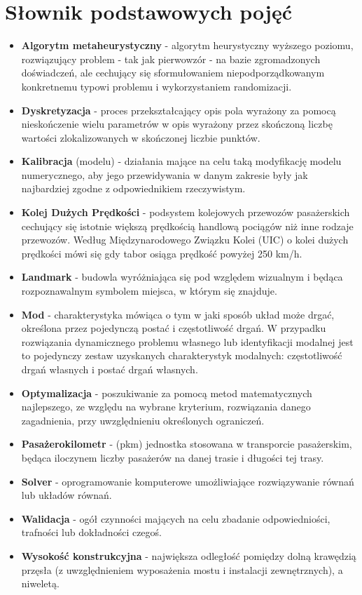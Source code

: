 \section*{Słownik podstawowych pojęć}
\begin{itemize}[label = {},leftmargin=0pt]
\item \textbf{Algorytm metaheurystyczny} - algorytm heurystyczny wyższego poziomu, rozwiązujący problem - tak jak pierwowzór - na bazie zgromadzonych doświadczeń, ale cechujący się sformułowaniem niepodporządkowanym konkretnemu typowi problemu i wykorzystaniem randomizacji. 
\item \textbf{Dyskretyzacja} - proces przekształcający opis pola wyrażony za pomocą nieskończenie wielu parametrów w opis wyrażony przez skończoną liczbę wartości zlokalizowanych w skończonej liczbie punktów.
\item \textbf{Kalibracja} (modelu) - działania mające na celu taką modyfikację modelu numerycznego, aby jego przewidywania w danym zakresie były jak najbardziej zgodne z odpowiednikiem rzeczywistym.
\item \textbf{Kolej Dużych Prędkości} - podsystem kolejowych przewozów pasażerskich cechujący się istotnie większą prędkością handlową pociągów niż inne rodzaje przewozów. Według Międzynarodowego Związku Kolei (UIC) o kolei dużych prędkości mówi się gdy tabor osiąga prędkość powyżej 250 km/h.
\item \textbf{Landmark} - budowla wyróżniająca się pod względem wizualnym i będąca rozpoznawalnym symbolem miejsca, w którym się znajduje.
\item \textbf{Mod}  -  charakterystyka mówiąca o tym w jaki sposób układ może drgać, określona przez pojedynczą postać i częstotliwość drgań. W przypadku rozwiązania dynamicznego problemu własnego lub identyfikacji modalnej jest to pojedynczy zestaw uzyskanych charakterystyk modalnych: częstotliwość drgań własnych i postać drgań własnych.
\item \textbf{Optymalizacja} - poszukiwanie za pomocą metod matematycznych najlepszego, ze względu na wybrane kryterium, rozwiązania danego zagadnienia, przy uwzględnieniu określonych ograniczeń.
\item \textbf{Pasażerokilometr} - (pkm) jednostka stosowana w transporcie pasażerskim, będąca iloczynem liczby pasażerów na danej trasie i długości tej trasy.
\item \textbf{Solver} - oprogramowanie komputerowe umożliwiające rozwiązywanie równań lub układów równań.
\item \textbf{Walidacja} - ogół czynności mających na celu zbadanie odpowiedniości, trafności lub dokładności czegoś.
\item \textbf{Wysokość konstrukcyjna} - największa odległość pomiędzy dolną krawędzią przęsła (z uwzględnieniem wyposażenia mostu i instalacji zewnętrznych), a niweletą.

\end{itemize}
\vfill
\pagebreak[4]

